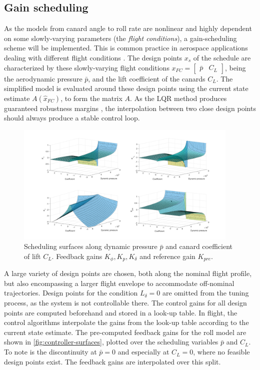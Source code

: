 \subsection{Gain scheduling}
\label{sec:controller-scheduling}
As the models from canard angle to roll rate are nonlinear and highly dependent on some slowly-varying parameters (the \textit{flight conditions}), a gain-scheduling scheme will be implemented. 
This is common practice in aerospace applications dealing with different flight conditions \cite{theis2023}.
The design points $x_s$ of the schedule are characterized by these slowly-varying flight conditions $x_{FC} = \begin{bmatrix} \bar p & C_L \end{bmatrix}$, being the aerodynamic pressure $\bar p$, and the lift coefficient of the canards $C_L$. 
The simplified model is evaluated around these design points using the current state estimate $A(\hat x_{FC})$, to form the matrix $A$.
As the LQR method produces guaranteed robustness margins \cite{doyle1978, werner2021, werner2021b}, the  interpolation between two close design points should always produce a stable control loop.
\begin{figure}[ht]
    \centering
    \includegraphics[width=0.95\textwidth]{images-design/controller_scheduling-surfaces.png}
    \caption[Scheduling surfaces along dynamic pressure and canard coefficient]{Scheduling surfaces along dynamic pressure $\bar p$ and canard coefficient of lift $C_L$. Feedback gains $K_\phi, K_p, K_\delta$ and reference gain $K_\textit{pre}$.}
    \label{fig:controller-surfaces}
\end{figure}

A large variety of design points are chosen, both along the nominal flight profile, but also encompassing a larger flight envelope to accommodate off-nominal trajectories.
Design points for the condition $L_\delta = 0$ are omitted from the tuning process, as the system is not controllable there.
The control gains for all design points are computed beforehand and stored in a look-up table.
In flight, the control algorithms interpolate the gains from the look-up table according to the current state estimate. 
The pre-computed feedback gains for the roll model are shown in \autoref{fig:controller-surfaces}, plotted over the scheduling variables $\bar p$ and $C_L$.
To note is the discontinuity at $\bar p = 0$ and especially at $C_L = 0$, where no feasible design points exist. 
The feedback gains are interpolated over this split.


